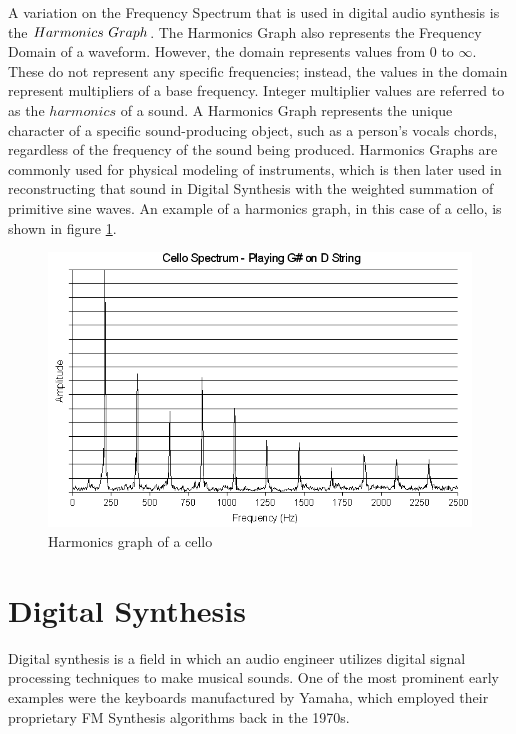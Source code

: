 \documentclass[a4paper,12pt]{report}
\begin{document}
A variation on the Frequency Spectrum that is used in digital audio synthesis is the $Harmonics\ \-Graph$. The Harmonics Graph also represents the Frequency Domain of a waveform. However, the domain represents values from 0 to $\infty$. These do not represent any specific frequencies; instead, the values in the domain represent multipliers of a base frequency. Integer multiplier values are referred to as the $harmonics$ of a sound. A Harmonics Graph represents the unique character of a specific sound-producing object, such as a person's vocals chords, regardless of the frequency of the sound being produced. Harmonics Graphs are commonly used for physical modeling of instruments, which is then later used in reconstructing that sound in Digital Synthesis with the weighted summation of primitive sine waves. An example of a harmonics graph, in this case of a cello, is shown in figure \ref{fig:CelloHarmonicsGraph}.

\begin{figure}
    \centering
    \includegraphics[width=36em]{CelloHarmonicsGraph.png}
    \caption{Harmonics graph of a cello}
    \label{fig:CelloHarmonicsGraph}
\end{figure}

\section{Digital Synthesis}
\label{subsec:digitalsynth}
Digital synthesis is a field in which an audio engineer utilizes digital signal processing techniques to make musical sounds. One of the most prominent early examples were the keyboards manufactured by Yamaha, which employed their proprietary FM Synthesis algorithms back in the 1970s.
\end{document}
